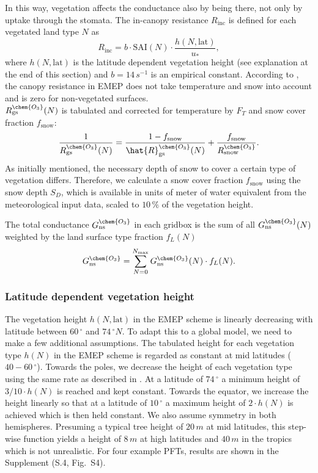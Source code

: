 \documentclass[gmd, manuscript]{copernicus}
\begin{document}
In this way, vegetation affects the conductance also by being there, not only by uptake through the stomata. The in-canopy resistance $R_\text{inc}$ is defined for each vegetated land type $N$ as
\begin{equation}
  R_\text{inc} = b \cdot \text{SAI}(N) \cdot \frac{h(N, \text{lat})}{u_*},
\end{equation}
where $h(N, \text{lat})$ is the latitude dependent vegetation height (see explanation at the end of this section) and $b = 14\,\unit{s^{-1}}$ is an empirical constant. According to \citet{ACP:Simpson2012}, the canopy resistance in EMEP does not take temperature and snow into account and is zero for non-vegetated surfaces.\\
$R_\text{gs}^\chem{O_3}(N)$ is tabulated and corrected for temperature by $F_T$ and snow cover fraction $f_\text{snow}$:
\begin{equation}
  \frac{1}{R_\text{gs}^\chem{O_3}(N)} = \frac{1-f_\text{snow}}{\hat{R}_\text{gs}^\chem{O_3}(N)} + \frac{f_\text{snow}}{R_\text{snow}^\chem{O_3}}.
\end{equation}
As initially mentioned, the necessary depth of snow to cover a certain type of vegetation differs. Therefore, we calculate a snow cover fraction $f_\text{snow}$ using the snow depth $S_D$, which is available in units of meter of water equivalent from the meteorological input data, scaled to $10\,\unit{\%}$ of the vegetation height.

The total conductance $G_\text{ns}^\chem{O_3}$ in each gridbox is the sum of all $G_\text{ns}^\chem{O_3}(N)$ weighted by the land surface type fraction $f_L(N)$
\begin{equation}
  G_\text{ns}^\chem{O_3} = \sum_{N=0}^{N_\text{max}}{G_\text{ns}^\chem{O_3}(N) \cdot f_L(N)}.
\end{equation}

\subsubsection{Latitude dependent vegetation height}
The vegetation height $h(N, \text{lat})$ in the EMEP scheme is linearly decreasing with latitude between $60\,\unit{^\circ}$ and $74\,\unit{^\circ N}$. To adapt this to a global model, we need to make a few additional assumptions. The tabulated height for each vegetation type $h(N)$ in the EMEP scheme is regarded as constant at mid latitudes ($40-60\,\unit{^\circ}$). Towards the poles, we decrease the height of each vegetation type using the same rate as described in \citet{ACP:Simpson2012}. At a latitude of $74\,\unit{^\circ}$ a minimum height of $3/10 \cdot h(N)$ is reached and kept constant. Towards the equator, we increase the height linearly so that at a latitude of $10\,\unit{^\circ}$ a maximum height of $2 \cdot h(N)$ is achieved which is then held constant. We also assume symmetry in both hemispheres. Presuming a typical tree height of $20\,\unit{m}$ at mid latitudes, this step-wise function yields a height of $8\,\unit{m}$ at high latitudes and $40\,\unit{m}$ in the tropics which is not unrealistic. For four example PFTs, results are shown in the Supplement (S.4, Fig.~S4). 
\end{document}
